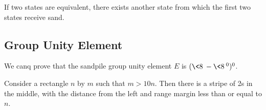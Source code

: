 \documentclass[11pt]{scrartcl}
\begin{document}
  \begin{exercise}

    If two states are equivalent, there exists another state from
    which the first two states receive sand.

  \end{exercise}

  \subsection{Group Unity Element}

  We canq prove that the sandpile group unity element $E$ is
  $(\<8\> - \<8\>^{0})^{0}$.

  \begin{theorem}
    Consider a rectangle $n$ by $m$ such that $m > 10 n$. Then there
    is a stripe of 2s in the middle, with the distance from the left
    and range margin less than or equal to $n$.
  \end{theorem}
\end{document}
